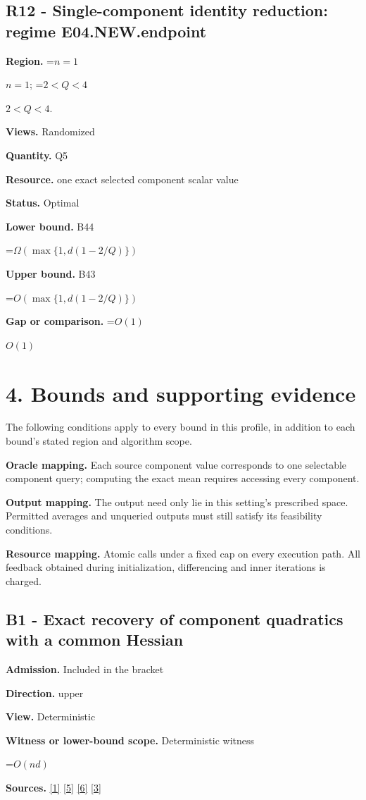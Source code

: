 \documentclass[10pt,a4paper]{article}
\newcommand{\AtlasMath}[1]{\par\begingroup\centering\setbox0=\hbox{$\displaystyle #1$}\ifdim\wd0>1.4\linewidth\typeout{ATLAS WIDE FORMULA: \the\wd0}\fi\ifdim\wd0>\linewidth\resizebox{\linewidth}{!}{\box0}\else\box0\fi\par\endgroup}
\newcommand{\AtlasInlineMath}[1]{\begingroup\setbox0=\hbox{$#1$}\ifdim\wd0>.4\linewidth\endgroup\AtlasMath{#1}\else\endgroup$#1$\fi}
\begin{document}
\subsection{R12 - Single-component identity reduction: regime E04.NEW.endpoint}
\textbf{Region.} \AtlasInlineMath{n=1}; \AtlasInlineMath{2<Q<4}.

\textbf{Views.} Randomized

\textbf{Quantity.} Q5

\textbf{Resource.} one exact selected component scalar value

\textbf{Status.} Optimal

\textbf{Lower bound.} B44

\AtlasMath{\Omega(\max\{1,d(1-2/Q)\})}
\textbf{Upper bound.} B43

\AtlasMath{O(\max\{1,d(1-2/Q)\})}
\textbf{Gap or comparison.} \AtlasInlineMath{O(1)}

\section{4. Bounds and supporting evidence}
The following conditions apply to every bound in this profile, in addition to each bound's stated region and algorithm scope.

\textbf{Oracle mapping.} Each source component value corresponds to one selectable component query; computing the exact mean requires accessing every component.

\textbf{Output mapping.} The output need only lie in this setting's prescribed space. Permitted averages and unqueried outputs must still satisfy its feasibility conditions.

\textbf{Resource mapping.} Atomic calls under a fixed cap on every execution path. All feedback obtained during initialization, differencing and inner iterations is charged.

\subsection{B1 - Exact recovery of component quadratics with a common Hessian}
\textbf{Admission.} Included in the bracket

\textbf{Direction.} upper

\textbf{View.} Deterministic

\textbf{Witness or lower-bound scope.} Deterministic witness

\AtlasMath{O(nd)}
\textbf{Sources.} \href{https://arxiv.org/html/2610.00345v1}{[1]} \href{https://arxiv.org/html/2607.16558v2}{[5]} \href{https://www.mathnet.ru/php/archive.phtml?jrnid=mzm&option_lang=eng&paperid=1697&wshow=paper}{[6]} \href{https://arxiv.org/abs/2109.08858}{[3]}
\end{document}
